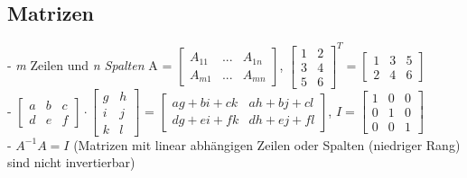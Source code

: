 \documentclass{report}
\begin{document}
  \subsection{Matrizen}	
  - \textit{m} Zeilen und \textit{n Spalten}	
  A = $\begin{bmatrix}A_{11} & ... & A_{1n}\\A_{m1} & ... & A_{mn} \end{bmatrix}$,	
  $\begin{bmatrix}1 & 2\\3 & 4\\5 & 6\end{bmatrix}^T = \begin{bmatrix}1 & 3 & 5\\2 & 4 & 6\end{bmatrix}$\\	
  - $\begin{bmatrix}a & b & c\\d & e & f\end{bmatrix}\cdot \begin{bmatrix}g & h\\i & j\\k & l\end{bmatrix}$	
  = $\begin{bmatrix}ag + bi + ck & ah + bj + cl\\dg + ei + fk & dh + ej + fl\end{bmatrix}$,	
  $I = \begin{bmatrix}1 & 0 & 0\\0 & 1 & 0\\0 & 0 &1\end{bmatrix}$\\	
  - $A^{-1}A = I$ (Matrizen mit linear abhängigen Zeilen oder Spalten (niedriger Rang) sind nicht invertierbar)	
\end{document}
